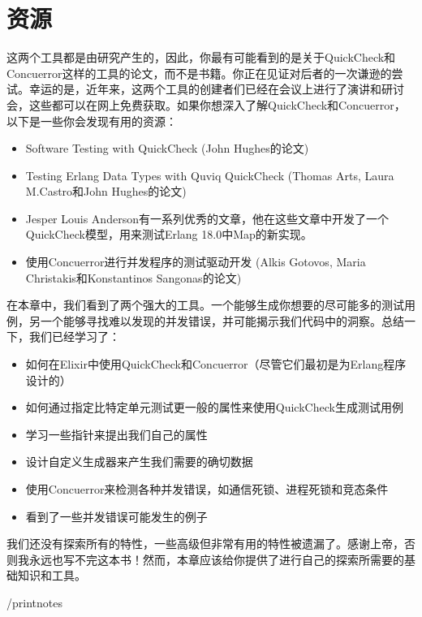 \section{资源}

这两个工具都是由研究产生的，因此，你最有可能看到的是关于QuickCheck和Concuerror这样的工具的论文，而不是书籍。你正在见证对后者的一次谦逊的尝试。幸运的是，近年来，这两个工具的创建者们已经在会议上进行了演讲和研讨会，这些都可以在网上免费获取。如果你想深入了解QuickCheck和Concuerror，以下是一些你会发现有用的资源：

\begin{itemize}
\item  Software Testing with QuickCheck (John Hughes的论文)
\item  Testing Erlang Data Types with Quviq QuickCheck (Thomas Arts, Laura M.Castro和John Hughes的论文)
\item  Jesper Louis  Anderson有一系列优秀的文章，他在这些文章中开发了一个QuickCheck模型，用来测试Erlang  18.0中Map的新实现。
\item  使用Concuerror进行并发程序的测试驱动开发 (Alkis Gotovos, Maria Christakis和Konstantinos Sangonas的论文)
\end{itemize}

在本章中，我们看到了两个强大的工具。一个能够生成你想要的尽可能多的测试用例，另一个能够寻找难以发现的并发错误，并可能揭示我们代码中的洞察。总结一下，我们已经学习了：

\begin{itemize}
\item  如何在Elixir中使用QuickCheck和Concuerror（尽管它们最初是为Erlang程序设计的）
\item  如何通过指定比特定单元测试更一般的属性来使用QuickCheck生成测试用例
\item  学习一些指针来提出我们自己的属性
\item  设计自定义生成器来产生我们需要的确切数据
\item  使用Concuerror来检测各种并发错误，如通信死锁、进程死锁和竞态条件
\item  看到了一些并发错误可能发生的例子
\end{itemize}

我们还没有探索所有的特性，一些高级但非常有用的特性被遗漏了。感谢上帝，否则我永远也写不完这本书！然而，本章应该给你提供了进行自己的探索所需要的基础知识和工具。

/printnotes
